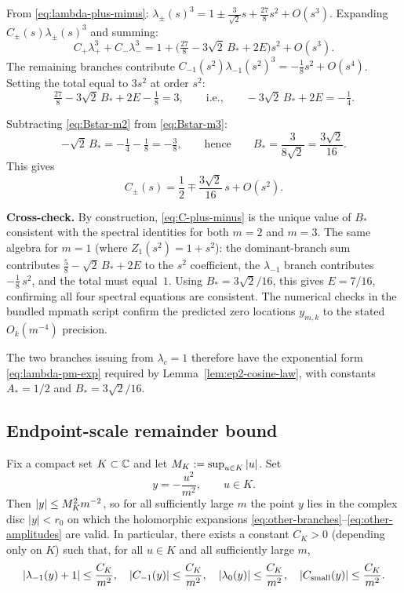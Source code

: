 From \eqref{eq:lambda-plus-minus}: $\lambda_\pm(s)^3=1\pm\tfrac{3}{\sqrt2}s+\tfrac{27}{8}s^2+O(s^3)$.
Expanding $C_\pm(s)\lambda_\pm(s)^3$ and summing:
\[
C_+\lambda_+^3+C_-\lambda_-^3
= 1+\bigl(\tfrac{27}{8}-3\sqrt2\,B_*+2E\bigr)s^2+O(s^3).
\]
The remaining branches contribute $C_{-1}(s^2)\lambda_{-1}(s^2)^3=-\tfrac{1}{8}s^2+O(s^4)$.
Setting the total equal to $3s^2$ at order $s^2$:
\begin{equation}\label{eq:Bstar-m3}
\tfrac{27}{8} - 3\sqrt2\,B_* + 2E - \tfrac18 = 3,
\qquad\text{i.e.,}\qquad
-3\sqrt2\,B_* + 2E = -\tfrac14.
\end{equation}

Subtracting \eqref{eq:Bstar-m2} from \eqref{eq:Bstar-m3}:
\[
-\sqrt2\,B_* = -\tfrac14-\tfrac18 = -\tfrac38,
\qquad\text{hence}\qquad
B_* = \frac{3}{8\sqrt2} = \frac{3\sqrt2}{16}.
\]
This gives
\begin{equation}\label{eq:C-plus-minus}
C_\pm(s)
=
\frac12\mp \frac{3\sqrt2}{16}\,s+O(s^2).
\end{equation}

\textbf{Cross-check.}
By construction, \eqref{eq:C-plus-minus} is the unique value of $B_*$ consistent with the spectral identities for both $m=2$ and $m=3$.
The same algebra for $m=1$ (where $Z_1(s^2)=1+s^2$): the dominant-branch sum contributes $\tfrac58-\sqrt2\,B_*+2E$ to the $s^2$ coefficient, the $\lambda_{-1}$ branch contributes $-\tfrac18\,s^2$, and the total must equal~$1$.
Using $B_*=3\sqrt2/16$, this gives $E=7/16$, confirming all four spectral equations are consistent.
The numerical checks in the bundled mpmath script confirm the predicted zero locations $y_{m,k}$ to the stated $O_k(m^{-4})$ precision.

The two branches issuing from $\lambda_c=1$ therefore have the exponential form \eqref{eq:lambda-pm-exp} required by Lemma~\ref{lem:ep2-cosine-law}, with constants $A_*=1/2$ and $B_*=3\sqrt2/16$.

\subsection{Endpoint-scale remainder bound}

Fix a compact set \(K\subset\mathbb{C}\) and let \(M_K:=\sup_{u\in K}\left\lvert u\right\rvert\).
Set
\[
y=-\frac{u^2}{m^2},
\qquad u\in K.
\]
Then \(\left\lvert y\right\rvert\le M_K^2m^{-2}\), so for all sufficiently large \(m\) the point \(y\) lies in the complex disc \(|y|<r_0\) on which the holomorphic expansions \eqref{eq:other-branches}--\eqref{eq:other-amplitudes} are valid.
In particular, there exists a constant \(C_K>0\) (depending only on \(K\)) such that, for all \(u\in K\) and all sufficiently large \(m\),
\begin{equation}\label{eq:y-bound}
\left\lvert \lambda_{-1}(y)+1\right\rvert\le \frac{C_K}{m^2},
\quad
\left\lvert C_{-1}(y)\right\rvert\le \frac{C_K}{m^2},
\quad
\left\lvert \lambda_0(y)\right\rvert\le \frac{C_K}{m^2},
\quad
\left\lvert C_{\mathrm{small}}(y)\right\rvert\le \frac{C_K}{m^2}.
\end{equation}

